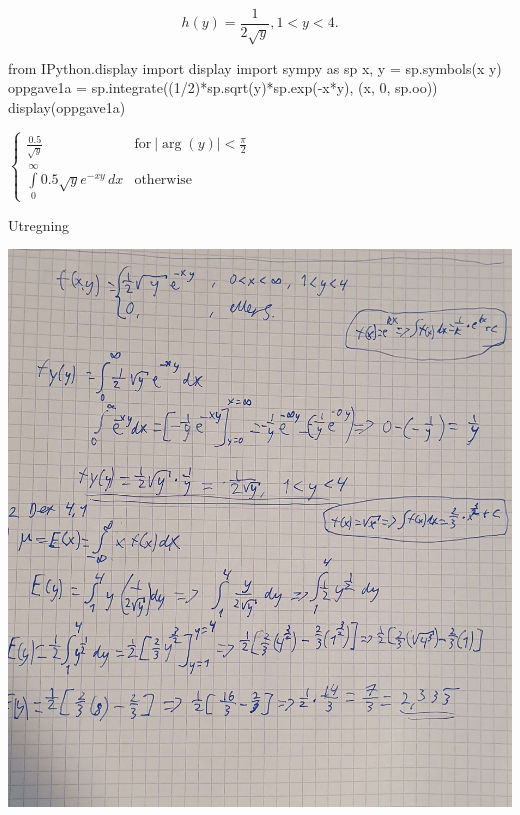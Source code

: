 \documentclass[
  12pt,
  a4paper,
  DIV=11,
  numbers=noendperiod]{scrartcl}
\newenvironment{Shaded}{\begin{snugshade}}{\end{snugshade}}
\newcommand{\DecValTok}[1]{\textcolor[rgb]{0.68,0.00,0.00}{#1}}
\newcommand{\ImportTok}[1]{\textcolor[rgb]{0.00,0.46,0.62}{#1}}
\newcommand{\NormalTok}[1]{\textcolor[rgb]{0.00,0.23,0.31}{#1}}
\newcommand{\OperatorTok}[1]{\textcolor[rgb]{0.37,0.37,0.37}{#1}}
\newcommand{\StringTok}[1]{\textcolor[rgb]{0.13,0.47,0.30}{#1}}
\begin{document}
\[ h(y) = \frac{1}{2\sqrt{y}}, 1 < y < 4. \]

\begin{Shaded}
\begin{Highlighting}[]
\ImportTok{from}\NormalTok{ IPython.display }\ImportTok{import}\NormalTok{ display}
\ImportTok{import}\NormalTok{ sympy }\ImportTok{as}\NormalTok{ sp}
\NormalTok{x, y }\OperatorTok{=}\NormalTok{ sp.symbols(}\StringTok{\textquotesingle{}x y\textquotesingle{}}\NormalTok{)}
\NormalTok{oppgave1a }\OperatorTok{=}\NormalTok{ sp.integrate((}\DecValTok{1}\OperatorTok{/}\DecValTok{2}\NormalTok{)}\OperatorTok{*}\NormalTok{sp.sqrt(y)}\OperatorTok{*}\NormalTok{sp.exp(}\OperatorTok{{-}}\NormalTok{x}\OperatorTok{*}\NormalTok{y), (x, }\DecValTok{0}\NormalTok{, sp.oo))}
\NormalTok{display(oppgave1a)}
\end{Highlighting}
\end{Shaded}

$\displaystyle \begin{cases} \frac{0.5}{\sqrt{y}} & \text{for}\: \left|{\arg{\left(y \right)}}\right| < \frac{\pi}{2} \\\int\limits_{0}^{\infty} 0.5 \sqrt{y} e^{- x y}\, dx & \text{otherwise} \end{cases}$

Utregning

\includegraphics{oblig2_utregning/oppgave1_a.jpg}
\end{document}
